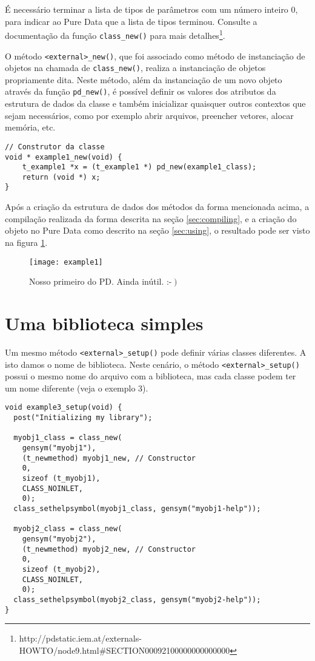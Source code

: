 É necessário terminar a lista de tipos de parâmetros com um número inteiro 0,
para indicar ao Pure Data que a lista de tipos terminou. Consulte a
documentação da função \texttt{class\_new()} para mais
detalhes\footnote{http://pdstatic.iem.at/externals-HOWTO/node9.html\#SECTION00092100000000000000}.

O método \texttt{<external>\_new()}, que foi associado como método de
instanciação de objetos na chamada de \texttt{class\_new()}, realiza a
instanciação de objetos propriamente dita. Neste método, além da instanciação
de um novo objeto através da função \texttt{pd\_new()}, é possível definir os
valores dos atributos da estrutura de dados da classe e também inicializar
quaisquer outros contextos que sejam necessários, como por exemplo abrir
arquivos, preencher vetores, alocar memória, etc.

\vspace{1em}
\begin{lstlisting}
// Construtor da classe
void * example1_new(void) {
    t_example1 *x = (t_example1 *) pd_new(example1_class);
    return (void *) x;
}
\end{lstlisting}

Após a criação da estrutura de dados dos métodos da forma mencionada acima, a
compilação realizada da forma descrita na seção \ref{sec:compiling}, e a
criação do objeto no Pure Data como descrito na seção \ref{sec:using}, o
resultado pode ser visto na figura \ref{fig:example01working}.

\begin{figure}[h!]
  \centering
  \texttt{[image: example1]}
  \caption{Nosso primeiro \external do PD. Ainda inútil. :-$\left.\right)$}
  \label{fig:example01working}
\end{figure}

\section{Uma biblioteca simples}

Um mesmo método \texttt{<external>\_setup()} pode definir várias classes
diferentes. A isto damos o nome de biblioteca. Neste cenário, o método
\texttt{<external>\_setup()} possui o mesmo nome do arquivo com a biblioteca,
mas cada classe podem ter um nome diferente (veja o exemplo 3).

\vspace{1em}
\begin{lstlisting}
void example3_setup(void) {
  post("Initializing my library");

  myobj1_class = class_new(
    gensym("myobj1"),
    (t_newmethod) myobj1_new, // Constructor
    0,
    sizeof (t_myobj1),
    CLASS_NOINLET,
    0);
  class_sethelpsymbol(myobj1_class, gensym("myobj1-help"));

  myobj2_class = class_new(
    gensym("myobj2"),
    (t_newmethod) myobj2_new, // Constructor
    0,
    sizeof (t_myobj2),
    CLASS_NOINLET,
    0);
  class_sethelpsymbol(myobj2_class, gensym("myobj2-help"));
}
\end{lstlisting}

